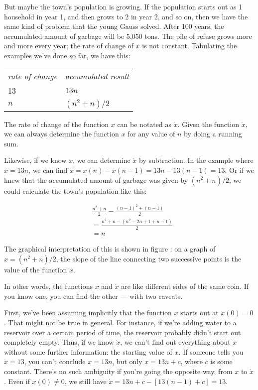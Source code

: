 But maybe the town's population is growing. If the population starts out
as 1 household in year 1, and then grows to 2 in year 2, and so on, then
we have the same kind of problem that the young Gauss solved. After 100
years, the accumulated amount of garbage will be 5,050 tons. The pile of
refuse grows more and more every year; the rate of change of $x$ is not
constant. Tabulating the examples we've done so far, we have this:

\noindent\begin{tabular}{p{23mm}p{23mm}}
\emph{rate of change} & \emph{accumulated result} \\
13             & $13n$ \\
$n$            & $(n^2+n)/2$
\end{tabular}

\newcommand{\xdot}{\dot{x}}

The rate of change of the function $x$ can be notated as $\xdot$.
Given the function $\xdot$, we can always determine the function $x$
for any value of $n$ by doing a running sum.

Likewise, if we know
$x$, we can determine $\xdot$ by subtraction. In the example
where $x=13n$, we can find $\xdot=x(n)-x(n-1)=13n-13(n-1)=13$.
Or if we knew that the accumulated amount of garbage was given by
$(n^2+n)/2$, we could calculate the town's population like
this:

\begin{align*}
  & \frac{n^2+n}{2} - \frac{(n-1)^2+(n-1)}{2}\\
   &= \frac{n^2+n-\left(n^2-2n+1+n-1\right)}{2} \\
   &= n
\end{align*}
\smallfig[h]{slope-interpretation}{$\xdot$ is the slope of $x$.}

The graphical interpretation of this is shown in figure
: on a graph of $x=(n^2+n)/2$, the slope of the line connecting two successive points is the value of the function $\xdot$.

In other words, the functions $x$ and $\xdot$ are like different
sides of the same coin. If you know one, you can find the other
--- with two caveats.

First, we've been assuming implicitly
that the function $x$ starts out at $x(0)=0$. That might not be
true in general. For instance, if we're adding water to a reservoir
over a certain period of time, the reservoir probably didn't start
out completely empty. Thus, if we know $\xdot$, we can't
find out everything about $x$ without some further information:
the starting value of $x$. If someone tells you $\xdot=13$,
you can't conclude $x=13n$, but only $x=13n+c$, where $c$ is
some constant. There's no such ambiguity if you're going the
opposite way, from $x$ to $\xdot$. Even if $x(0)\ne 0$, we
still have $\xdot=13n+c-[13(n-1)+c]=13$.

